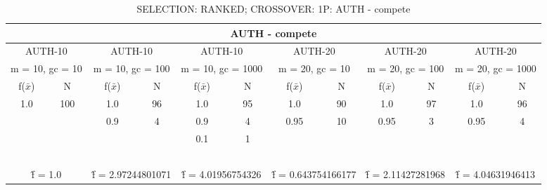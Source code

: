 \begin{table}[H]
	\centering
	\caption{SELECTION: RANKED; CROSSOVER: 1P: AUTH - compete}
	\begin{adjustbox}{width=1\textwidth}
		\begin{tabular}{ |c|c||c|c||c|c||c|c||c|c||c|c| }
			\hline
			\multicolumn{12}{|c|}{AUTH - compete} \\
			\hline
			\multicolumn{2}{|c||}{AUTH-10} & \multicolumn{2}{c||}{AUTH-10} & \multicolumn{2}{c||}{AUTH-10} & \multicolumn{2}{c||}{AUTH-20} & \multicolumn{2}{c||}{AUTH-20} & \multicolumn{2}{c|}{AUTH-20}\\
			\hline
			\multicolumn{2}{|c||}{m = 10, gc = 10} & \multicolumn{2}{c||}{m = 10, gc = 100} & \multicolumn{2}{c||}{m = 10, gc = 1000} & \multicolumn{2}{c||}{m = 20, gc = 10} & \multicolumn{2}{c||}{m = 20, gc = 100} & \multicolumn{2}{c|}{m = 20, gc = 1000}\\
			\hline
			f($\bar{x}$) & N & f($\bar{x}$) & N & f($\bar{x}$) & N & f($\bar{x}$) & N & f($\bar{x}$) & N & f($\bar{x}$) & N\\
			\hline
			\hline
			1.0 & 100 & 1.0 & 96 & 1.0 & 95 & 1.0 & 90 & 1.0 & 97 & 1.0 & 96\\
			&   & 0.9 & 4 & 0.9 & 4 & 0.95 & 10 & 0.95 & 3 & 0.95 & 4\\
			&   &   &   & 0.1 & 1 &   &   &   &   &   &  \\
			&   &   &   &   &   &   &   &   &   &   &  \\
			&   &   &   &   &   &   &   &   &   &   &  \\
			&   &   &   &   &   &   &   &   &   &   &  \\
			&   &   &   &   &   &   &   &   &   &   &  \\
			&   &   &   &   &   &   &   &   &   &   &  \\
			\hline
			\multicolumn{2}{|c||}{\^{f} = 1.0} & \multicolumn{2}{c||}{\^{f} = 2.97244801071} & \multicolumn{2}{c||}{\^{f} = 4.01956754326} & \multicolumn{2}{c||}{\^{f} = 0.643754166177} & \multicolumn{2}{c||}{\^{f} = 2.11427281968} & \multicolumn{2}{c|}{\^{f} = 4.04631946413}\\
			\hline
		\end{tabular}
	\end{adjustbox}
\end{table}
